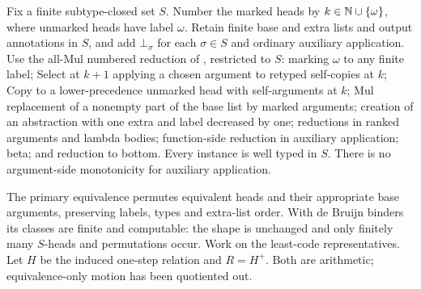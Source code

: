 \documentclass[11pt,a4paper]{article}
\begin{document}
Fix a finite subtype-closed set $S$.  Number the marked heads by
$k\in\mathbb N\cup\{\omega\}$, where unmarked heads have label $\omega$.
Retain finite base and extra lists and output annotations in $S$, and add
$\bot_\sigma$ for each $\sigma\in S$ and ordinary auxiliary application.
Use the all-Mul numbered reduction of \cite[Section 5.3]{kop}, restricted to
$S$: marking $\omega$ to any finite label; Select at $k+1$ applying a chosen
argument to retyped self-copies at $k$; Copy to a lower-precedence unmarked
head with self-arguments at $k$; Mul replacement of a nonempty part of the
base list by marked arguments; creation of an abstraction with one extra and
label decreased by one; reductions in ranked arguments and lambda bodies;
function-side reduction in auxiliary application; beta; and reduction to
bottom.  Every instance is well typed in $S$.  There is no argument-side
monotonicity for auxiliary application.

The primary equivalence permutes equivalent heads and their appropriate
base arguments, preserving labels, types and extra-list order.  With de Bruijn
binders its classes are finite and computable: the shape is unchanged and only
finitely many $S$-heads and permutations occur.  Work on the least-code
representatives.  Let $H$ be the induced one-step relation and $R=H^+$.
Both are arithmetic; equivalence-only motion has been quotiented out.
\end{document}
